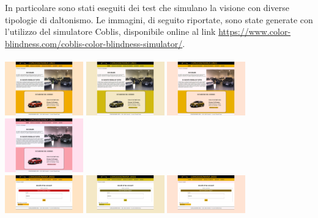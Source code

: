 In particolare sono stati eseguiti dei test che simulano la visione con diverse tipologie di daltonismo. Le immagini, di seguito riportate, sono state generate con l'utilizzo del simulatore Coblis, disponibile online al link \url{https://www.color-blindness.com/coblis-color-blindness-simulator/}.\\
\\
\includegraphics[width=8pc]{./img/homepage-normal.png} \includegraphics[width=8pc]{./img/homepage-protanopia.png} \includegraphics[width=8pc]{./img/homepage-deuteranopia.png} \includegraphics[width=8pc]{./img/homepage-tritanopia.png}\\

\includegraphics[width=8pc]{./img/pagina_accesso_errore-normal.png} \includegraphics[width=8pc]{./img/pagina_accesso_errore-protanopia.png} \includegraphics[width=8pc]{./img/pagina_accesso_errore-deuteranopia.png} 